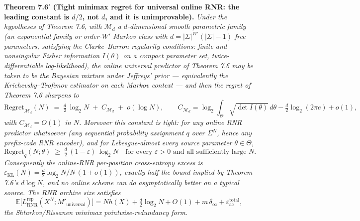 \documentclass[
]{article}
\begin{document}
\textbf{Theorem 7.6$'$ (Tight minimax regret for universal online RNR:
the leading constant is $d/2$, not $d$, and it is unimprovable).}
\emph{Under the hypotheses of Theorem 7.6, with $\mathcal{M}_d$ a
$d$-dimensional smooth parametric family (an exponential family or
order-$W'$ Markov class with $d = |\Sigma|^{W'}(|\Sigma|-1)$
free parameters, satisfying the Clarke--Barron regularity conditions:
finite and nonsingular Fisher information $I(\theta)$ on a compact
parameter set, twice-differentiable log-likelihood), the online
universal predictor of Theorem 7.6 may be taken to be the
Bayesian mixture under Jeffreys' prior --- equivalently the
Krichevsky--Trofimov estimator on each Markov context --- and then
the regret of Theorem 7.6 sharpens to}
\[
\mathrm{Regret}_{\mathcal{M}_d}(N)
\;=\;
\tfrac{d}{2}\,\log_2 N \;+\; C_{\mathcal{M}_d} \;+\; o(\log N),
\qquad
C_{\mathcal{M}_d} = \log_2\!\!\int_\Theta\!\!\sqrt{\det I(\theta)}\,d\theta
- \tfrac{d}{2}\log_2(2\pi e) + o(1),
\]
\emph{with $C_{\mathcal{M}_d} = O(1)$ in $N$. Moreover this constant is
\emph{tight}: for any online RNR predictor whatsoever (any sequential
probability assignment $q$ over $\Sigma^N$, hence any prefix-code
RNR encoder), and for Lebesgue-almost every source parameter
$\theta \in \Theta$,}
\[
\mathrm{Regret}_{q}(N;\theta) \;\geq\; \tfrac{d}{2}\,(1-\varepsilon)\,\log_2 N
\quad\text{for every }\varepsilon>0\text{ and all sufficiently large }N.
\]
\emph{Consequently the online-RNR per-position cross-entropy excess is
$\varepsilon_{\mathrm{KL}}(N) = \tfrac{d}{2}\log_2 N / N \,(1+o(1))$,
exactly half the bound implied by Theorem 7.6's
$d\log N$, and no online scheme can do asymptotically better on a
typical source. The RNR archive size satisfies}
\[
\mathbb{E}\bigl[L^{\mathrm{rep}}_{\mathrm{RNR}}(X^N;M'_{\mathrm{universal}})\bigr]
= N h(X) + \tfrac{d}{2}\log_2 N + O(1)
+ m\,\delta_\infty + \varepsilon_{\mathrm{ac}}^{\mathrm{total}},
\]
\emph{the Shtarkov/Rissanen minimax pointwise-redundancy form.}
\end{document}

